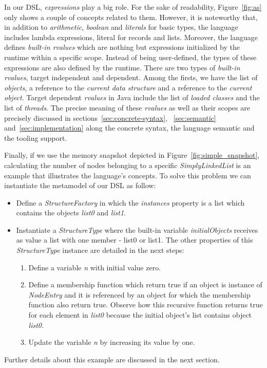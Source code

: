 In our DSL, \textit{expressions} play a big role.
For the sake of readability, Figure~\ref{fig:as} only shows a couple of concepts related to them.
However, it is noteworthy that, in addition to \textit{arithmetic}, \textit{boolean} and \textit{literals} for basic types, the language includes lambda expressions, literal for records and lists.
Moreover, the language defines \textit{built-in rvalues} which are nothing but expressions initialized by the runtime within a specific scope.
Instead of being user-defined, the types of these expressions are also defined by the runtime.
There are two types of \textit{built-in rvalues}, target independent and dependent.
Among the firsts, we have the list of  \textit{objects}, a reference to the \textit{current data structure} and a reference to the \textit{current object}.
Target dependent \textit{rvalues} in Java include the list of \textit{loaded classes} and the list of \textit{threads}.
The precise meaning of these \textit{rvalues} as well as their scopes are precisely discussed in sections~\ref{sec:concrete-syntax}, ~\ref{sec:semantic} and~\ref{sec:implementation} along the concrete syntax, the language semantic and the tooling support.

Finally, if we use the memory snapshot depicted in Figure~\ref{fig:simple_snapshot}, calculating the number of nodes belonging to a specific \textit{SimplyLinkedList} is an example that illustrates the language's concepts.
To solve this problem we can instantiate the metamodel of our DSL as follow:
\begin{itemize}
\item Define a \textit{StructureFactory} in which the \textit{instances} property is a list which contains the objects \textit{list0} and \textit{list1}.
\item Instantiate a \textit{StructureType} where the built-in variable \textit{initialObjects} receives as value a list with one member - list0 or list1.
      The other properties of this \textit{StructureType} instance are detailed in the next steps: 
      \begin{enumerate}
      \item Define a variable \textit{n} with initial value zero.
      \item Define a membership function which return true if an object is instance of \textit{NodeEntry} and it is referenced by an object for which the membership function also return true. Observe how this recursive function returns true for each element in \textit{list0} because the initial object's list contains object \textit{list0}. 
      \item Update the variable \textit{n} by increasing its value by one.
      \end{enumerate}  
\end{itemize}
Further details about this example are discussed in the next section.

